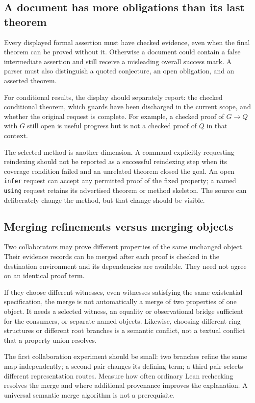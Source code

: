 \documentclass[11pt,letterpaper]{article}
\newcommand{\code}[1]{\nolinkurl{#1}}
\theoremstyle{remark}
\begin{document}
\subsection{A document has more obligations than its last theorem}
Every displayed formal assertion must have checked evidence, even when the
final theorem can be proved without it. Otherwise a document could contain a
false intermediate assertion and still receive a misleading overall success
mark. A parser must also distinguish a quoted conjecture, an open obligation,
and an asserted theorem.

For conditional results, the display should separately report: the checked
conditional theorem, which guards have been discharged in the current scope,
and whether the original request is complete. For example, a checked proof of
$G\to Q$ with $G$ still open is useful progress but is not a checked proof of
$Q$ in that context.

The selected method is another dimension. A command explicitly requesting
reindexing should not be reported as a successful reindexing step when its
coverage condition failed and an unrelated theorem closed the goal. An open
\code{infer} request can accept any permitted proof of the fixed property;
a named \code{using} request retains its advertised theorem or method skeleton.
The source can deliberately change the method, but that change should be visible.

\subsection{Merging refinements versus merging objects}
Two collaborators may prove different properties of the same unchanged
object. Their evidence records can be merged after each proof is checked in
the destination environment and its dependencies are available. They need not
agree on an identical proof term.

If they choose different witnesses, even witnesses satisfying the same
existential specification, the merge is not automatically a merge of two
properties of one object. It needs a selected witness, an equality or
observational bridge sufficient for the consumers, or separate named objects.
Likewise, choosing different ring structures or different root branches is a
semantic conflict, not a textual conflict that a property union resolves.

The first collaboration experiment should be small: two branches refine the
same map independently; a second pair changes its defining term; a third pair
selects different representation routes. Measure how often ordinary Lean
rechecking resolves the merge and where additional provenance improves the
explanation. A universal semantic merge algorithm is not a prerequisite.
\end{document}
